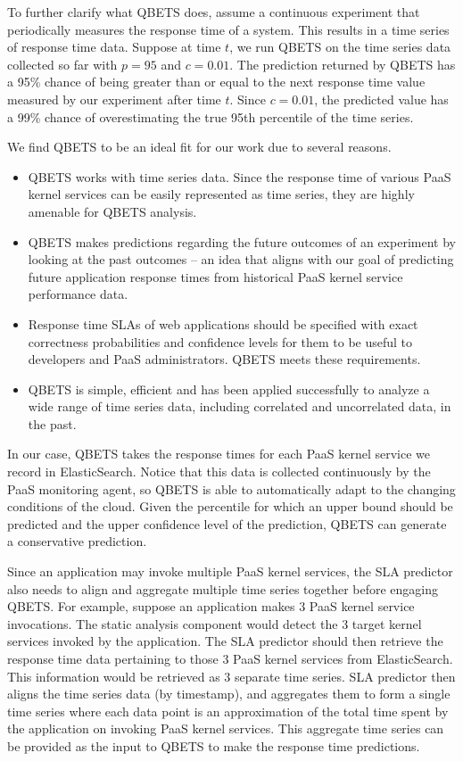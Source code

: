 \documentclass[11pt]{article}
\begin{document}
To further clarify what QBETS does, assume a continuous experiment 
that periodically measures the
response time of a system. This results in a time series of 
response time data. Suppose at time $t$,
we run QBETS on the time series data collected so far 
with $p=95$ and $c=0.01$. The prediction returned
by QBETS has a 95\% chance of being greater than or equal 
to the next response time value measured
by our experiment after time $t$. Since $c=0.01$, the predicted value has a 99\% chance of
overestimating the true 95th percentile of the time series.

We find QBETS to be an ideal fit for our work due to several reasons. 
\begin{itemize}
\item QBETS works with time series data. Since the response time
of various PaaS kernel services can be easily represented as time series,
they are highly amenable for QBETS analysis. 
\item QBETS makes predictions regarding the
future outcomes of an experiment by looking at the past 
outcomes -- an idea that aligns with our
goal of predicting future application response times from historical PaaS kernel service performance data. 
\item Response time
SLAs of web applications should be specified with exact correctness 
probabilities and confidence levels for
them to be useful to developers and PaaS administrators. QBETS meets these requirements.
\item QBETS is 
simple, efficient and has been applied successfully to analyze a wide range of time series 
data, including correlated and uncorrelated data, in the past.
\end{itemize}

In our case, QBETS takes the response times for each PaaS kernel service 
we record in ElasticSearch.
Notice that this data is collected continuously by the PaaS monitoring agent, 
so QBETS is able to automatically adapt to the changing conditions of the cloud. 
Given the percentile for which 
an upper bound should be predicted and the upper confidence level of the prediction, 
QBETS can generate a conservative prediction. 

Since an application may invoke multiple PaaS kernel services, the SLA predictor also needs
to align and aggregate multiple time series together before engaging QBETS. For example, suppose
an application makes 3 PaaS kernel service invocations. The static analysis component would detect the
3 target kernel services invoked by the application. The SLA predictor should then retrieve the response time
data pertaining to those 3 PaaS kernel services from ElasticSearch. This information would be retrieved as
3 separate time series. SLA predictor then aligns the time series data (by timestamp), and aggregates them
to form a single time series where each data point is an approximation of the total time spent by the application
on invoking PaaS kernel services. This aggregate time series can be provided as the input to QBETS to
make the response time predictions.
\end{document}
